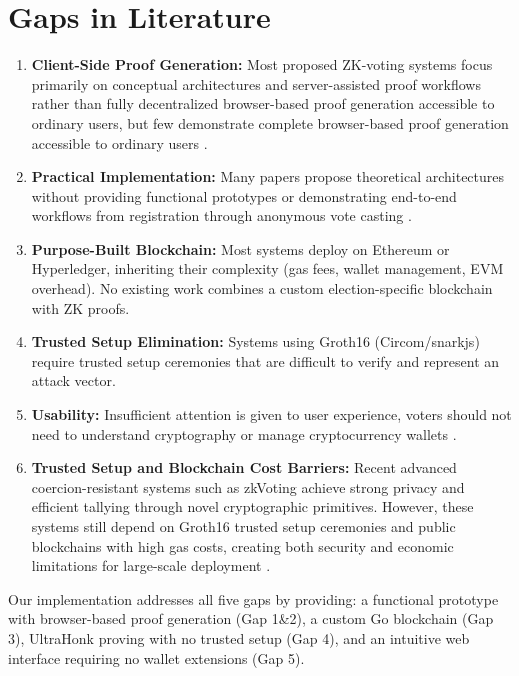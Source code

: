 \documentclass[12pt, a4paper]{report}
\begin{document}
\section{Gaps in Literature}
\begin{enumerate}
    \item \textbf{Client-Side Proof Generation:} Most proposed ZK-voting systems focus primarily on conceptual architectures and server-assisted proof workflows rather than fully decentralized browser-based proof generation accessible to ordinary users, but few demonstrate complete browser-based proof generation accessible to ordinary users \cite{mdpi2024evoting, vladucu2023evoting}.
    
    \item \textbf{Practical Implementation:} Many papers propose theoretical architectures without providing functional prototypes or demonstrating end-to-end workflows from registration through anonymous vote casting \cite{mdpi2022scalability, prajapat2020investigating}.
    
    \item \textbf{Purpose-Built Blockchain:} Most systems deploy on Ethereum or Hyperledger, inheriting their complexity (gas fees, wallet management, EVM overhead). No existing work combines a custom election-specific blockchain with ZK proofs.
    
    \item \textbf{Trusted Setup Elimination:} Systems using Groth16 (Circom/snarkjs) require trusted setup ceremonies that are difficult to verify and represent an attack vector.
    
    \item \textbf{Usability:} Insufficient attention is given to user experience, voters should not need to understand cryptography or manage cryptocurrency wallets \cite{mdpi2024evoting, vladucu2023evoting}.

    \item \textbf{Trusted Setup and Blockchain Cost Barriers:} Recent advanced coercion-resistant systems such as zkVoting achieve strong privacy and efficient tallying through novel cryptographic primitives. However, these systems still depend on Groth16 trusted setup ceremonies and public blockchains with high gas costs, creating both security and economic limitations for large-scale deployment \cite{park2024zkvoting}.
\end{enumerate}

Our implementation addresses all five gaps by providing: a functional prototype with browser-based proof generation (Gap 1\&2), a custom Go blockchain (Gap 3), UltraHonk proving with no trusted setup (Gap 4), and an intuitive web interface requiring no wallet extensions (Gap 5).
\end{document}
